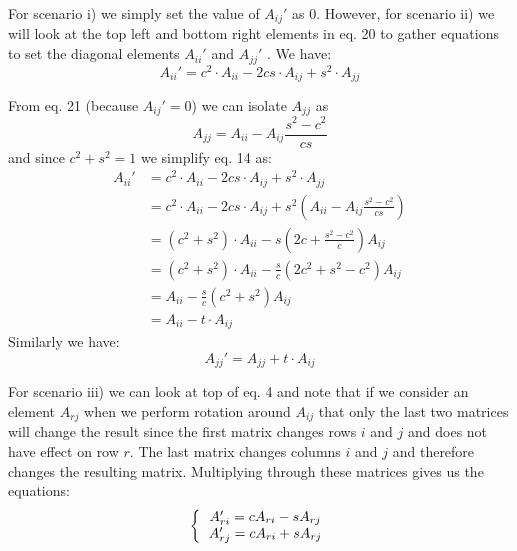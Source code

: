\documentclass[12pt,twoside]{article}
\begin{document}
For scenario i) we simply set the value of $A_{ij}'$ as 0. However, for scenario ii) we will look at the top left and bottom right elements in eq. 20 to gather equations to set the diagonal elements $A_{ii}'$ and $A_{jj}'$ . We have:
\begin{equation}
A_{ii}' = c^2 \cdot A_{ii} - 2cs\cdot A_{ij} + s^2\cdot A_{jj}
\end{equation}

From eq. 21 (because $A_{ij}'=0$) we can isolate $A_{jj}$ as\\
\begin{equation}
A_{jj} = A_{ii} - A_{ij}\frac{s^2-c^2}{cs}
\end{equation}
and since $c^2+s^2=1$ we simplify eq. 14 as:
\begin{equation}
\begin{split}
A_{ii}' &= c^2 \cdot A_{ii} - 2cs\cdot A_{ij} + s^2\cdot A_{jj}\\
& = c^2 \cdot A_{ii} - 2cs\cdot A_{ij} + s^2 \left(A_{ii} - A_{ij}\frac{s^2-c^2}{cs}     \right)\\
& = (c^2 + s^2) \cdot A_{ii} - s\left(2c +  \frac{s^2-c^2}{c}      \right)A_{ij}\\
&= (c^2 + s^2) \cdot A_{ii} - \frac{s}{c}\left(2c^2 +  s^2-c^2      \right)A_{ij}\\
& = A_{ii} - \frac{s}{c}\left(c^2 +  s^2      \right)A_{ij}\\
& = A_{ii} - t\cdot A_{ij} 
\end{split}
\end{equation}
Similarly we have:\\
\begin{equation}
A_{jj}' = A_{jj} + t\cdot A_{ij}
\end{equation}



For scenario iii) we can look at top of eq. 4 and note that if we consider an element $A_{rj}$ when we perform rotation around $A_{ij}$ that only the last two matrices will change the result since the first matrix changes rows $i$ and $j$ and does not have effect on row $r$. The last matrix changes columns $i$ and $j$ and therefore changes the resulting matrix. Multiplying through these matrices gives us the equations:
\begin{equation}
\bigg\{
  \begin{tabular}{cc}
$A_{ri}' = cA_{ri} - sA_{rj}$\\
$A_{rj}' = cA_{ri} + sA_{rj}$\\
  \end{tabular}
\end{equation}\\
\end{document}
